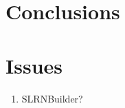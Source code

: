 \documentclass[unnumsec,webpdf,contemporary,large]{oup-authoring-template}%
\theoremstyle{thmstyleone}%
\theoremstyle{thmstyletwo}%
\theoremstyle{thmstylethree}%
\begin{document}
\section{Conclusions}

\section{Issues}
\begin{enumerate}
    \item SLRNBuilder?
\end{enumerate}



\end{document}
